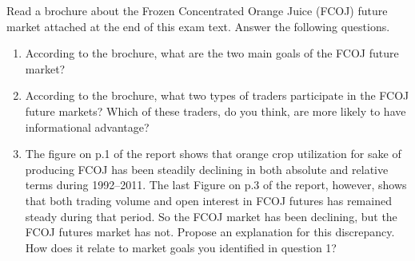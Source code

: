\documentclass[a4paper]{article}
\newif\ifsolutions
\begin{document}
Read a brochure about the Frozen Concentrated Orange Juice (FCOJ) future market attached at the end of this exam text. Answer the following questions.
\begin{enumerate}
	\item According to the brochure, what are the two main goals of the FCOJ future market?
	
	\item According to the brochure, what two types of traders participate in the FCOJ future markets? Which of these traders, do you think, are more likely to have informational advantage?
	
	\item The figure on p.1 of the report shows that orange crop utilization for sake of producing FCOJ has been steadily declining in both absolute and relative terms during 1992--2011. The last Figure on p.3 of the report, however, shows that both trading volume and open interest in FCOJ futures has remained steady during that period. So the FCOJ market has been declining, but the FCOJ futures market has not. Propose an explanation for this discrepancy. How does it relate to market goals you identified in question 1?
\end{enumerate}

\ifsolutions
\subsection*{Solution}
\begin{enumerate}
	\item Price discovery and risk transfer.
	\item Commercial/hedging traders (related to citrus, juice-packing, or retail business) and speculative traders (everyone else). Speculators only have access to public information, while commercial traders have relevant insider information from their business activities. (It is, however, possible, that speculators are better at processing publicly available information than commercial traders, so they would have a different kind of informational advantage.)
	\item While the relevance of FCOJ as a commodity has declined, this financial asset ``remains the most visible price discovery mechanism for the [citrus] industry''. I.e., this asset is relevant to other forms of juices and other types of citrus, and serves as a proxy asset for hedgers seeking to insure against risks in citrus/citrus juice markets more broadly, and enables price discovery in those markets.
\end{enumerate}
\fi





{\ifsolutions \else	
	
\fi}
\end{document}
